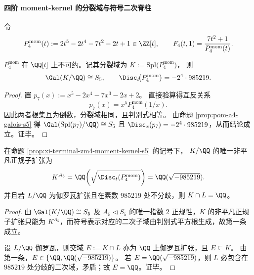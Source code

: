 \paragraph{四阶 moment-kernel 的分裂域与符号二次脊柱}
令
\[
P^{\mathrm{mom}}_{4}(t):=2t^{5}-2t^{4}-7t^{2}-2t+1\in\ZZ[t],
\qquad
F_4(t,1)=\frac{7t^2+1}{P^{\mathrm{mom}}_{4}(t)}.
\]

\begin{proposition}\label{prop:xi-terminal-zm4-moment-kernel-s5}
\(P^{\mathrm{mom}}_{4}\) 在 \(\QQ[t]\) 上不可约。记其分裂域为
\(
K:=\mathrm{Spl}\bigl(P^{\mathrm{mom}}_{4}\bigr)
\)，
则
\[
\Gal(K/\QQ)\cong S_{5},
\qquad
\Disc_{t}\!\bigl(P^{\mathrm{mom}}_{4}\bigr)=-2^{4}\cdot 985219.
\]
\end{proposition}
\begin{proof}
置
\(
p_7(x):=x^{5}-2x^{4}-7x^{3}-2x+2
\)。
直接验算得互反关系
\[
p_7(x)=x^{5}P^{\mathrm{mom}}_{4}(1/x).
\]
因此两者根集互为倒数，分裂域相同，且判别式相等。
由命题 \ref{prop:pom-a4-galois-s5} 得 \(\Gal(\mathrm{Spl}(p_7)/\QQ)\cong S_5\) 且 \(\Disc_x(p_7)=-2^4\cdot 985219\)，从而结论成立。证毕。
\end{proof}

\begin{proposition}[唯一二次子域与分歧刚性]\label{prop:xi-terminal-zm4-moment-kernel-unique-quadratic}
在命题 \ref{prop:xi-terminal-zm4-moment-kernel-s5} 的记号下，
\(
K/\QQ
\)
的唯一非平凡正规子扩张为
\[
K^{A_5}=\QQ\!\left(\sqrt{\Disc_{t}(P^{\mathrm{mom}}_{4})}\right)=\QQ(\sqrt{-985219}).
\]
并且若 \(L/\QQ\) 为伽罗瓦扩张且在素数 \(985219\) 处不分歧，则 \(K\cap L=\QQ\)。
\end{proposition}
\begin{proof}
由 \(\Gal(K/\QQ)\cong S_5\) 及 \(A_5\triangleleft S_5\) 的唯一指数 \(2\) 正规性，\(K\) 的非平凡正规子扩张只能为 \(K^{A_5}\)，而符号表示对应的二次子域由判别式平方根生成，故第一条成立。
\par
设 \(L/\QQ\) 伽罗瓦，则交域 \(E:=K\cap L\) 亦为 \(\QQ\) 上伽罗瓦扩张，且 \(E\subseteq K\)。
由第一条，\(E\in\{\QQ,\QQ(\sqrt{-985219})\}\)。
若 \(E=\QQ(\sqrt{-985219})\)，则 \(L\) 必包含在 \(985219\) 处分歧的二次域，矛盾；故 \(E=\QQ\)。证毕。
\end{proof}

